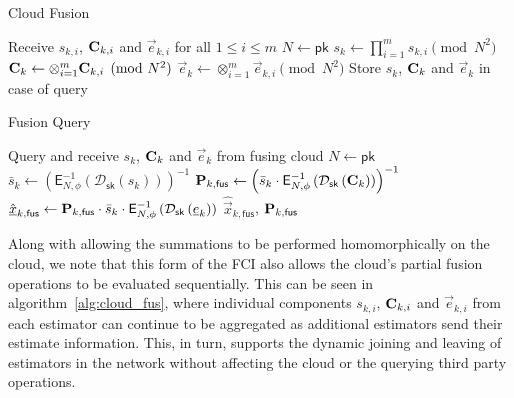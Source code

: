 \documentclass[letterpaper, 10 pt, conference]{ieeeconf}
\begin{document}
\begin{algorithm}[htbp]
\caption{Cloud Fusion}\label{alg:cloud_fus}
\begin{algorithmic}[1]
    \State Receive $s_{k,i}$, ${{\mathbf{C}}}_{k,i}$ and $\vec{e}_{k,i}$ for all $1\leq i \leq m$
    \State $N \gets \mathsf{pk}$
    \State $s_k \gets \prod_{i=1}^{m} s_{k,i} \pmod{N^2}$
    \State ${{\mathbf{C}}}_k \gets \otimes_{i=1}^{m} {{\mathbf{C}}}_{k,i} \pmod{N^2}$
    \State $\vec{e}_k \gets \otimes_{i=1}^{m} \vec{e}_{k,i} \pmod{N^2}$
    \State Store $s_k$, ${{\mathbf{C}}}_k$ and $\vec{e}_k$ in case of query
    \EndProcedure
\end{algorithmic}
\end{algorithm}
\begin{algorithm}[htbp]
\caption{Fusion Query}\label{alg:fus_query}
\begin{algorithmic}[1]
    \State Query and receive $s_k$, ${{\mathbf{C}}}_k$ and $\vec{e}_k$ from fusing cloud
    \State $N \gets \mathsf{pk}$
    \State $\bar{s}_k \gets \left(\mathsf{E}^{-1}_{N,\phi}\left(\mathcal{D}_{\mathsf{sk}}\left(s_k\right)\right)\right)^{-1}$
    \State ${{\mathbf{P}}}_{k,\mathsf{fus}} \gets \left(\bar{s}_k \cdot \mathsf{E}^{-1}_{N,\phi}\left(\mathcal{D}_{\mathsf{sk}}\left({{\mathbf{C}}}_k\right)\right)\right)^{-1}$
    \State $\hat{{\underline{x}}}_{k,\mathsf{fus}} \gets {\ensuremath{{\mathbf{P}}}}_{k,\mathsf{fus}} \cdot \bar{s}_k \cdot \mathsf{E}^{-1}_{N,\phi}\left(\mathcal{D}_{\mathsf{sk}}\left({\underline{e}}_k\right)\right)$
    \State \Return $\hat{\vec{x}}_{k,\mathsf{fus}}$, ${{\mathbf{P}}}_{k,\mathsf{fus}}$
    \EndProcedure
\end{algorithmic}
\end{algorithm}

Along with allowing the summations to be performed homomorphically on the cloud, we note that this form of the FCI also allows the cloud's partial fusion operations to be evaluated sequentially. This can be seen in algorithm~\ref{alg:cloud_fus}, where individual components $s_{k,i}$, ${{\mathbf{C}}}_{k,i}$ and $\vec{e}_{k,i}$ from each estimator can continue to be aggregated as additional estimators send their estimate information. This, in turn, supports the dynamic joining and leaving of estimators in the network without affecting the cloud or the querying third party operations.

% 
%                                 
%                                 
%                                 
% 
\end{document}
